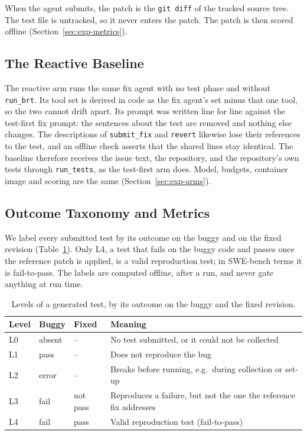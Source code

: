 When the agent submits, the patch is the \texttt{git diff} of the tracked
source tree. The test file is untracked, so it never enters the patch. The
patch is then scored offline (Section~\ref{sec:exp-metrics}).

\subsection{The Reactive Baseline}
\label{sec:method-baseline}

The reactive arm runs the same fix agent with no test phase and without
\texttt{run\_brt}. Its tool set is derived in code as the fix agent's set minus
that one tool, so the two cannot drift apart. Its prompt was written line for
line against the test-first fix prompt: the sentences about the test are
removed and nothing else changes. The descriptions of \texttt{submit\_fix} and
\texttt{revert} likewise lose their references to the test, and an offline
check asserts that the shared lines stay identical. The baseline therefore receives the issue text, the repository, and
the repository's own tests through \texttt{run\_tests}, as the test-first arm
does. Model, budgets, container image and scoring are the same
(Section~\ref{sec:exp-arms}).

\subsection{Outcome Taxonomy and Metrics}
\label{sec:method-levels}

We label every submitted test by its outcome on the buggy and on the fixed
revision (Table~\ref{tab:levels}). Only L4, a test that fails on the buggy code
and passes once the reference patch is applied, is a valid reproduction test;
in SWE-bench terms it is fail-to-pass. The labels are computed offline, after a
run, and never gate anything at run time.

\begin{table}[t]
  \caption{Levels of a generated test, by its outcome on the buggy and the
  fixed revision.}
  \label{tab:levels}
  \small
  \begin{tabularx}{\linewidth}{@{}lllX@{}}
    \toprule
    Level & Buggy & Fixed & Meaning \\
    \midrule
    L0 & absent & -- & No test submitted, or it could not be collected \\
    L1 & pass & -- & Does not reproduce the bug \\
    L2 & error & -- & Breaks before running, e.g.\ during collection or set-up \\
    L3 & fail & not pass & Reproduces a failure, but not the one the reference fix addresses \\
    L4 & fail & pass & Valid reproduction test (fail-to-pass) \\
    \bottomrule
  \end{tabularx}
\end{table}

